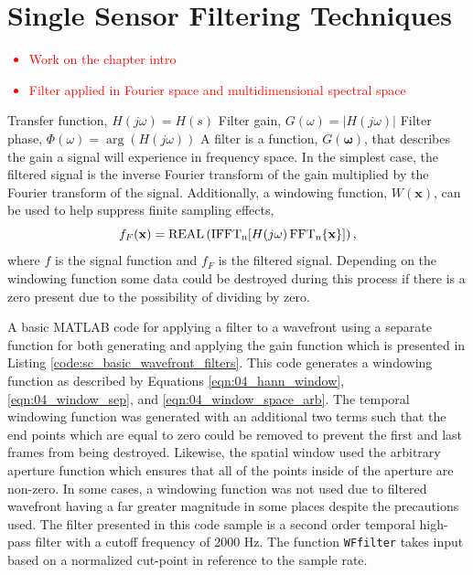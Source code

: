 
\chapter{Single Sensor Filtering Techniques}
\label{chap:06_single_filter}
\textcolor{red}{
  \begin{itemize}
    \item Work on the chapter intro
    \item Filter applied in Fourier space and multidimensional spectral space
  \end{itemize}
}

Transfer function, $H(j\omega) = H(s)$
Filter gain, $G(\omega) = |H(j\omega)|$
Filter phase, $\Phi(\omega) = \arg(H(j\omega))$
A filter is a function, $G(\mathbf{\omega})$, that describes the gain a signal will experience in frequency space.
In the simplest case, the filtered signal is the inverse Fourier transform of the gain multiplied by the Fourier transform of the signal.
Additionally, a windowing function, $W(\mathbf{x})$, can be used to help suppress finite sampling effects,
\begin{equation}
 f_F(\mathbf{x}) = \operatorname{REAL}\left(\operatorname{IFFT_n}[H(j\mathbf{\omega})\operatorname{FFT_n}\{\mathbf{x}\}]\right) \textrm{,}
 \label{eqn:06_filter_function}
\end{equation}
where $f$ is the signal function and $f_F$ is the filtered signal.
Depending on the windowing function some data could be destroyed during this process if there is a zero present due to the possibility of dividing by zero.

A basic MATLAB code for applying a filter to a wavefront using a separate function for both generating and applying the gain function which is presented in Listing \ref{code:sc_basic_wavefront_filters}.
This code generates a windowing function as described by Equations \ref{eqn:04_hann_window}, \ref{eqn:04_window_sep}, and \ref{eqn:04_window_space_arb}.
The temporal windowing function was generated with an additional two terms such that the end points which are equal to zero could be removed to prevent the first and last frames from being destroyed.
Likewise, the spatial window used the arbitrary aperture function which ensures that all of the points inside of the aperture are non-zero.
In some cases, a windowing function was not used due to filtered wavefront having a far greater magnitude in some places despite the precautions used.
The filter presented in this code sample is a second order temporal high-pass filter with a cutoff frequency of 2000 Hz.
The function \lstinline{WFfilter} takes input based on a normalized cut-point in reference to the sample rate.

